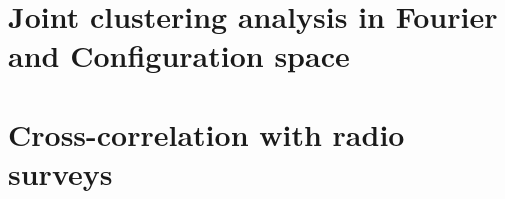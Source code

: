 \section{Joint clustering analysis in Fourier and Configuration space}
\label{galaxies:joint}




\section{Cross-correlation with radio surveys}
\label{galaxies:radio}

\cite{wolzHIConstraintsCrosscorrelation2021}